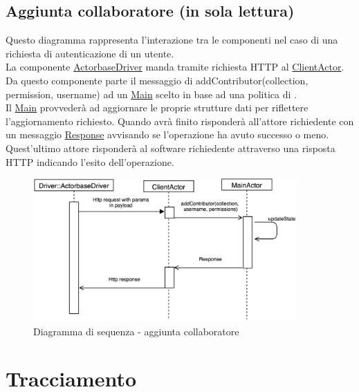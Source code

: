 \documentclass{scalatekids-article}
\begin{document}
\subsection{Aggiunta collaboratore (in sola lettura)}

Questo diagramma rappresenta l'interazione tra le componenti nel caso di una richiesta di autenticazione di un utente.\\
La componente \hyperref[sec:actorbase::driver::ActorbaseDriver]{ActorbaseDriver}
manda tramite richiesta HTTP al \hyperref[sec:actorbase::actorsystem::actors::clientactor::ClientActor]{ClientActor}.\\
Da questo componente parte il messaggio di addContributor(collection, permission, username) ad un
\hyperref[sec:actorbase::actorsystem::actors::main::Main]{Main} scelto in base ad una
politica di .\\Il \hyperref[sec:actorbase::actorsystem::actors::main::Main]{Main} provvederà ad aggiornare
le proprie strutture dati per riflettere l'aggiornamento richiesto. Quando avrà
finito risponderà all'attore richiedente con un messaggio \hyperref[sec:actorbase::actorsystem::messages::clientactormessages::Response]{Response}
avvisando se l'operazione ha avuto successo o meno. Quest'ultimo attore
risponderà al software richiedente attraverso una risposta HTTP indicando
l'esito dell'operazione.\\
\begin{figure}[H]
  \begin{center}
    \includegraphics[width=0.9\textwidth, keepaspectratio]{img/diagrammiSequenza/esempioAddContributor.png}
    \caption{Diagramma di sequenza - aggiunta collaboratore}
  \end{center}
\end{figure}






\section{Tracciamento}
\end{document}
